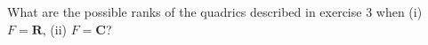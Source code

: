What are the possible ranks of the quadrics described in exercise 3 when (i) $F = \mathbf{R}$, (ii) $F = \mathbf{C}$?
